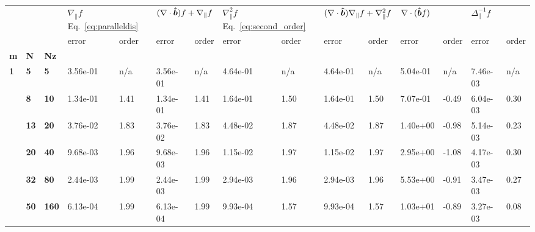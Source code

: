 \begin{tabular}{lllllllllllllll}
\toprule
  &     &     & \multicolumn{2}{l}{$\nabla_\parallel f$
  Eq.~\eqref{eq:paralleldis}} & \multicolumn{2}{l}{$(\nabla\cdot\bm{\hat{b}}) f +
  \nabla_\parallel f$} &
  \multicolumn{2}{l}{$\nabla_\parallel^2 f$ Eq.~\eqref{eq:second_order}} &
  \multicolumn{2}{l}{$(\nabla\cdot\bm{\hat{b}})\nabla_\parallel f + \nabla_\parallel^2
  f$} & \multicolumn{2}{l}{$\nabla\cdot(\bm{\hat{b}} f)$} &
  \multicolumn{2}{l}{$\Delta_\parallel^{-1}f $} \\
  &    &     &     error & order &             error & order &     error & order &     error & order &       error &  order &          error & order \\
\textbf{m} & \textbf{N} & \textbf{Nz} &           &       &                   &       &           &       &           &       &             &        &                &       \\
\midrule
\textbf{1} & \textbf{5 } & \textbf{5  } &  3.56e-01 &   n/a &          3.56e-01 &   n/a &  4.64e-01 &   n/a &  4.64e-01 &   n/a &    5.04e-01 &    n/a &       7.46e-03 &   n/a \\
  & \textbf{8 } & \textbf{10 } &  1.34e-01 &  1.41 &          1.34e-01 &  1.41 &  1.64e-01 &  1.50 &  1.64e-01 &  1.50 &    7.07e-01 &  -0.49 &       6.04e-03 &  0.30 \\
  & \textbf{13} & \textbf{20 } &  3.76e-02 &  1.83 &          3.76e-02 &  1.83 &  4.48e-02 &  1.87 &  4.48e-02 &  1.87 &    1.40e+00 &  -0.98 &       5.14e-03 &  0.23 \\
  & \textbf{20} & \textbf{40 } &  9.68e-03 &  1.96 &          9.68e-03 &  1.96 &  1.15e-02 &  1.97 &  1.15e-02 &  1.97 &    2.95e+00 &  -1.08 &       4.17e-03 &  0.30 \\
  & \textbf{32} & \textbf{80 } &  2.44e-03 &  1.99 &          2.44e-03 &  1.99 &  2.94e-03 &  1.96 &  2.94e-03 &  1.96 &    5.53e+00 &  -0.91 &       3.47e-03 &  0.27 \\
  & \textbf{50} & \textbf{160} &  6.13e-04 &  1.99 &          6.13e-04 &  1.99 &  9.93e-04 &  1.57 &  9.93e-04 &  1.57 &    1.03e+01 &  -0.89 &       3.27e-03 &  0.08 \\
\bottomrule
\end{tabular}

